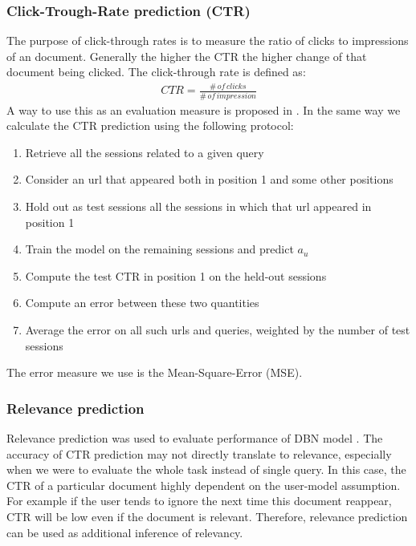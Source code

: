 \subsubsection{Click-Trough-Rate prediction (CTR)}
The purpose of click-through rates is to measure the ratio of clicks to impressions of an document.
Generally the higher the CTR the higher change of that document being clicked.
The click-through rate is defined as:
\begin{align*}
	CTR = \frac{\# \, of \, clicks}{\# \, of \, impression}
\end{align*}
A way to use this as an evaluation measure is proposed in \cite[p. 4]{Chapelle2009}. In the same way we calculate the CTR prediction using the following protocol:
\begin{enumerate}
	\item Retrieve all the sessions related to a given query
	\item Consider an url that appeared both in position 1 and some other positions
	\item Hold out as test sessions all the sessions in which that url appeared in position 1
	\item Train the model on the remaining sessions and predict $a_u$
	\item Compute the test CTR in position 1 on the held-out sessions
	\item Compute an error between these two quantities
	\item  Average the error on all such urls and queries, weighted by the number of test sessions
\end{enumerate}

The error measure we use is the Mean-Square-Error (MSE).

\subsubsection{Relevance prediction}
Relevance prediction was used to evaluate performance of DBN model \cite[p. 6]{Chapelle2009}.
The accuracy of CTR prediction may not directly translate to relevance, especially when we were to evaluate the whole task instead of single query.
In this case, the CTR of a particular document highly dependent on the user-model assumption.
For example if the user tends to ignore the next time this document reappear, CTR will be low even if the document is relevant.
Therefore, relevance prediction can be used as additional inference of relevancy.


